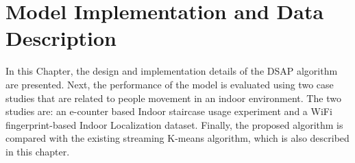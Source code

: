 \setlength{\parindent}{2em}










% 

\chapter{ Model Implementation and Data Description}

In this Chapter, the design and implementation details of the DSAP algorithm are presented. Next, the performance of the model is evaluated using two case studies that are related to people movement in an indoor environment. The two studies are: an e-counter based Indoor staircase usage experiment and a WiFi fingerprint-based Indoor Localization dataset. Finally, the proposed algorithm is compared with the existing streaming K-means algorithm, which is also described in this chapter.








